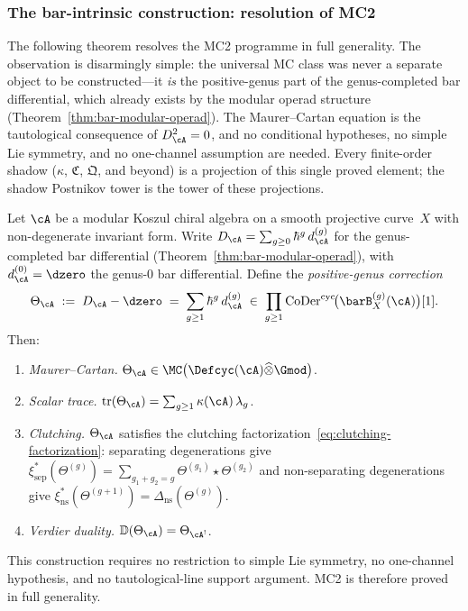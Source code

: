 \subsubsection*{The bar-intrinsic construction: resolution of MC2}

The following theorem resolves the MC2 programme in full generality.
The observation is disarmingly simple: the universal MC class was
never a separate object to be constructed---it \emph{is} the
positive-genus part of the genus-completed bar differential, which
already exists by the modular operad structure
(Theorem~\ref{thm:bar-modular-operad}).  The Maurer--Cartan equation
is the tautological consequence of $D_\cA^2 = 0$, and no conditional
hypotheses, no simple Lie symmetry, and no one-channel assumption
are needed.  Every finite-order shadow
($\kappa$, $\mathfrak{C}$, $\mathfrak{Q}$, and beyond) is a
projection of this single proved element; the shadow Postnikov tower
is the tower of these projections.

\begin{theorem}
\label{thm:mc2-bar-intrinsic}
Let $\cA$ be a modular Koszul chiral algebra on a smooth
projective curve~$X$ with non-degenerate invariant form.
Write
$D_\cA = \sum_{g \geq 0} \hbar^g\, d_\cA^{(g)}$
for the genus-completed bar differential
\textup{(}Theorem~\textup{\ref{thm:bar-modular-operad}}\textup{)},
with $d_\cA^{(0)} = \dzero$ the genus-$0$ bar differential.
Define the \emph{positive-genus correction}
\begin{equation}\label{eq:theta-bar-intrinsic}
\Theta_\cA
\;:=\;
D_\cA - \dzero
\;=\;
\sum_{g \geq 1} \hbar^g\, d_\cA^{(g)}
\;\in\;
\prod_{g \geq 1}
\operatorname{CoDer}^{\mathrm{cyc}}\!\bigl(
  \barB^{(g)}_X(\cA)
\bigr)[1].
\end{equation}
Then:
\begin{enumerate}[label=\textup{(\roman*)}]
\item \emph{Maurer--Cartan.}
  $\Theta_\cA \in
  \MC\bigl(\Defcyc(\cA) \widehat{\otimes} \Gmod\bigr)$.
\item \emph{Scalar trace.}
  $\operatorname{tr}(\Theta_\cA)
  = \sum_{g \geq 1} \kappa(\cA)\,\lambda_g$.
\item \emph{Clutching.}
  $\Theta_\cA$ satisfies the clutching
  factorization~\eqref{eq:clutching-factorization}: separating
  degenerations give
  $\xi_{\mathrm{sep}}^*(\Theta^{(g)})
  = \sum_{g_1+g_2=g}
  \Theta^{(g_1)} \star \Theta^{(g_2)}$
  and non-separating degenerations give
  $\xi_{\mathrm{ns}}^*(\Theta^{(g+1)})
  = \Delta_{\mathrm{ns}}(\Theta^{(g)})$.
\item \emph{Verdier duality.}
  $\mathbb{D}(\Theta_\cA) = \Theta_{\cA^!}$.
\end{enumerate}
This construction requires no restriction to simple Lie symmetry,
no one-channel hypothesis, and no tautological-line support
argument.  MC2 is therefore proved in full generality.
\end{theorem}

